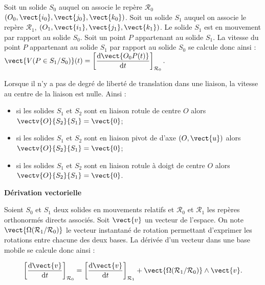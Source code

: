 \begin{defi} 

Soit un solide $S_0$ auquel on associe le repère $\mathcal{R}_0$ $\left(O_0,\vect{i_0},\vect{j_0},\vect{k_0} \right)$.  Soit un solide $S_1$ auquel on associe le repère $\mathcal{R}_1$,  $\left(O_1,\vect{i_1},\vect{j_1},\vect{k_1} \right)$. Le solide $S_1$ est en mouvement par rapport au solide $S_0$. 
Soit un point $P$ appartenant au solide $S_1$. La vitesse du point $P$ appartenant au solide $S_1$ par rapport au solide $S_0$ se calcule donc ainsi : $
\vect{V(P\in S_1/S_0)}(t) = \left[\dfrac{\text{d}\vect{O_0P(t)}}{\text{d}t}\right]_{\mathcal{R}_0}.
$
\end{defi}

\begin{exemple}

\end{exemple}


\begin{resultat}
Lorsque il n'y a pas de degré de liberté de translation dans une liaison, la vitesse au centre de la liaison est nulle. Ainsi : 
\begin{itemize}
\item si les solides $S_1$ et $S_2$ sont en liaison rotule de centre $O$ alors $\vectv{O}{S_2}{S_1}=\vect{0}$;
\item si les solides $S_1$ et $S_2$ sont en liaison pivot de d'axe $\left(O,\vect{u}\right)$ alors $\vectv{O}{S_2}{S_1}=\vect{0}$;
\item si les solides $S_1$ et $S_2$ sont en liaison rotule à doigt de centre $O$ alors $\vectv{O}{S_2}{S_1}=\vect{0}$.
\end{itemize}
\end{resultat}


\begin{resultat}
\textbf{Dérivation vectorielle}

Soient $S_0$ et $S_1$ deux solides en mouvements relatifs et $\mathcal{R}_0$ et $\mathcal{R}_1$ les repères orthonormés directs associés. Soit $\vect{v}$ un vecteur de l'espace. On note $\vect{\Omega(\mathcal{R}_1/\mathcal{R}_0)}$ le vecteur instantané de rotation permettant d'exprimer les rotations entre chacune des deux bases. La dérivée d'un vecteur dans une base mobile se calcule donc ainsi :

$$
\left[\dfrac{\text{d}\vect{v}}{\text{d}t}\right]_{\mathcal{R}_0} =
\left[\dfrac{\text{d}\vect{v}}{\text{d}t}\right]_{\mathcal{R}_1} 
+ \vect{\Omega(\mathcal{R}_1/\mathcal{R}_0)}\wedge \vect{v}.
$$
\end{resultat}


